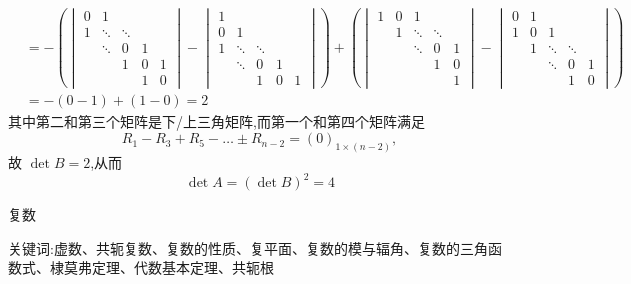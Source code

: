 \begin{questions}
\begin{solution}
\begin{align*}
        &= - \left( \begin{vmatrix} 
        0 & 1 & & & \\ 
        1 & \ddots & \ddots & & \\ 
        & \ddots & 0 & 1 & \\ 
        & & 1 & 0 & 1 \\ 
        & & & 1 & 0 
        \end{vmatrix} - 
        \begin{vmatrix} 
        1 & & & & \\ 
        0 & 1 & & & \\ 
        1 & \ddots & \ddots & & \\ 
        & \ddots & 0 & 1 \\ 
        & & 1 & 0 & 1 
        \end{vmatrix} \right) + 
        \left( \begin{vmatrix} 
        1 & 0 & 1 & & \\ 
        & 1 & \ddots & \ddots & \\ 
        & & \ddots & 0 & 1 \\ 
        & & & 1 & 0 \\ 
        & & & & 1 
        \end{vmatrix} - \begin{vmatrix} 
        0 & 1 & & & \\ 
        1 & 0 & 1 & & \\ 
        & 1 & \ddots & \ddots & \\ 
        & & \ddots & 0 & 1 \\ 
        & & & 1 & 0 \end{vmatrix} \right) \\
        &= -(0 - 1) + (1 - 0) = 2
        \end{align*}
        其中第二和第三个矩阵是下/上三角矩阵,而第一个和第四个矩阵满足 
        \[
        R_1 - R_3 + R_5 - \dots \pm R_{n-2} = (0)_{1\times(n-2)},
        \]
        故 $\det B = 2$,从而 
        \[
        \det A = (\det B)^2 = 4
        \]
    \end{solution}
\end{questions}
\pagebreak

\begin{center}
  {\fontsize{30pt}{26pt}\selectfont
    \hypertarget{复数}{复数} \label{复数}
  }
\end{center}
\separator
\begin{center}
    关键词:虚数、共轭复数、复数的性质、复平面、复数的模与辐角、复数的三角函数式、棣莫弗定理、代数基本定理、共轭根
\end{center}
\vspace{0.5pt}

